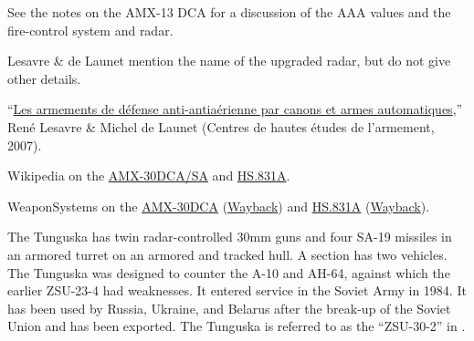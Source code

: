 \begin{withcounters}
{        See the notes on the AMX-13 DCA for a discussion of the AAA values and the fire-control system and radar.

        Lesavre \& de Launet mention the name of the upgraded radar, but do not give other details.

        \begin{notesources}
            \item “\href{https://www.yumpu.com/fr/document/view/16630048/les-armements-de-defense-antiaerienne-souvenirs-de-la-}{\foreignlanguage{french}{Les armements de défense anti-antiaérienne par canons et armes automatiques}},” René Lesavre \& Michel de Launet (\foreignlanguage{french}{Centres de hautes études de l'armement}, 2007).
            \item Wikipedia on the \href{https://en.wikipedia.org/wiki/AMX-30\#AMX-30_DCA_–_défense_contre_avion}{AMX-30DCA/SA} and \href{https://en.wikipedia.org/wiki/Oerlikon_KCB}{HS.831A}.
            \item WeaponSystems on the \href{https://weaponsystems.net/system/114-AMX-30+DCA}{AMX-30DCA} (\href{https://web.archive.org/web/20260624131728/https://weaponsystems.net/system/114-AMX-30+DCA}{Wayback}) and \href{https://weaponsystems.net/system/1562-30mm\%20Hispano-Suiza\%20HS.831}{HS.831A} (\href{https://web.archive.org/web/20260624132150/https://weaponsystems.net/system/1562-30mm\%20Hispano-Suiza\%20HS.831}{Wayback}).
        \end{notesources}
    }


    The Tunguska has twin radar-controlled 30mm guns and four SA-19 missiles in an armored turret on an armored and tracked hull.
    A section has two vehicles.
    The Tunguska was designed to counter the A-10 and AH-64, against which the earlier ZSU-23-4 had weaknesses.
    It entered service in the Soviet Army in 1984. It has been used by Russia, Ukraine, and Belarus after the break-up of the Soviet Union and has been exported.
    The Tunguska is referred to as the “ZSU-30-2” in {\AirStr}.%
\end{withcounters}
